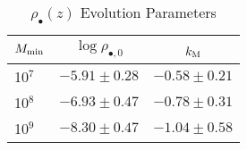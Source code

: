 \documentclass[twocolumn, twocolappendix]{aastex63}
\begin{document}
\begin{CJK*}{UTF8}{gbsn}
\begin{table}
\renewcommand\thetable{1} %
\caption{$\rho_\bullet(z)$ Evolution Parameters}
\begin{center}
\begin{tabular}{l c r}
\hline
$M_{\rm min}$ & $\log \rho_{\bullet,0}$ & $k_{\rm M}$ ~~~ \\ 
\hline 
\hline
10$^7$  &  $-5.91\pm 0.28$  &  $-0.58 \pm 0.21$  \\
10$^8$  &  $-6.93\pm 0.47$  &  $-0.78 \pm 0.31$  \\
10$^9$  &  $-8.30\pm 0.47$  &  $-1.04 \pm 0.58$ \\
\hline 
\end{tabular}
\label{tab:MFz}
\end{center}
\end{table}  


\end{CJK*}
\end{document}
